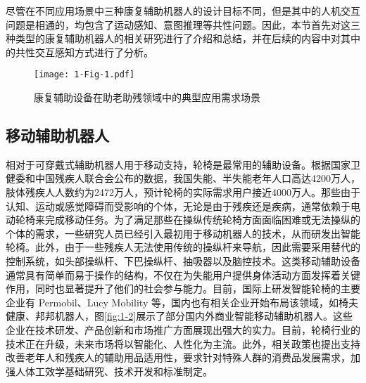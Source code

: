 尽管在不同应用场景中三种康复辅助机器人的设计目标不同，但是其中的人机交互问题是相通的，均包含了运动感知、意图推理等共性问题。因此，本节首先对这三种类型的康复辅助机器人的相关研究进行了介绍和总结，并在后续的内容中对其中的共性交互感知方式进行了分析。

\begin{figure}[htb]
  \centering
  \texttt{[image: 1-Fig-1.pdf]}
  \caption{康复辅助设备在助老助残领域中的典型应用需求场景}
  \label{fig:1-1}
\end{figure}

\subsection{移动辅助机器人}
相对于可穿戴式辅助机器人用于移动支持，轮椅是最常用的辅助设备\cite{worldhealthorganizationGuidelinesProvisionManual2008b}。根据国家卫健委和中国残疾人联合会公布的数据，我国失能、半失能老年人口高达4200万人，肢体残疾人人数约为2472万人，预计轮椅的实际需求用户接近4000万人。那些由于认知、运动或感觉障碍而受影响的个体，无论是由于残疾还是疾病，通常依赖于电动轮椅来完成移动任务。为了满足那些在操纵传统轮椅方面面临困难或无法操纵的个体的需求，一些研究人员已经引入最初用于移动机器人的技术，从而研发出智能轮椅。此外，由于一些残疾人无法使用传统的操纵杆来导航，因此需要采用替代的控制系统，如头部操纵杆、下巴操纵杆、抽吸器以及脑控技术\cite{kimLiteratureReviewSmart2023,carringtonWearablesChairablesInclusive2014,rulikControlWheelchairMounted6DOF2022}。这类移动辅助设备通常具有简单而易于操作的结构，不仅在为失能用户提供身体活动方面发挥着关键作用，同时也显著提升了他们的社会参与能力。目前，国际上研发智能轮椅的主要企业有 Permobil、Lucy Mobility 等，国内也有相关企业开始布局该领域，如椅夫健康、邦邦机器人，图\ref{fig:1-2}展示了部分国内外商业智能移动辅助机器人。这些企业在技术研发、产品创新和市场推广方面展现出强大的实力。目前，轮椅行业的技术正在升级，未来市场将以智能化、人性化为主流。此外，相关政策也提出支持改善老年人和残疾人的辅助用品适用性，要求针对特殊人群的消费品发展需求，加强人体工效学基础研究、技术开发和标准制定。


